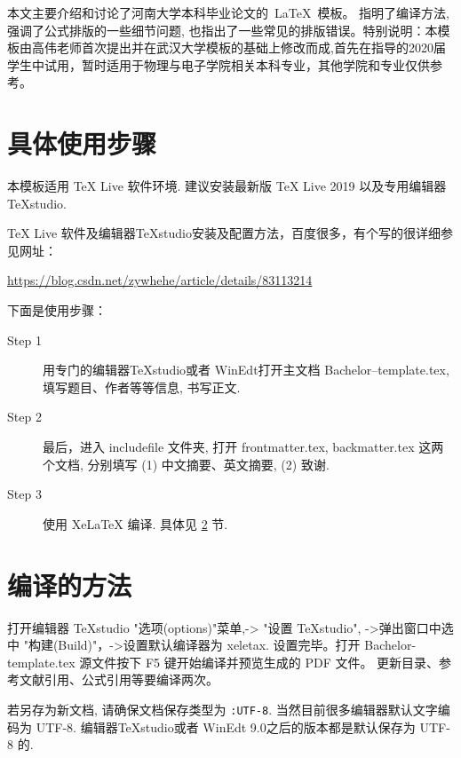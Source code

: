 \documentclass[forprint]{HedaBachelor}
\begin{document}
 本文主要介绍和讨论了河南大学本科毕业论文的~\LaTeX~模板。
 指明了编译方法, 强调了公式排版的一些细节问题, 也指出了一些常见的排版错误。特别说明：本模板由高伟老师首次提出并在武汉大学模板的基础上修改而成,首先在指导的2020届学生中试用，暂时适用于物理与电子学院相关本科专业，其他学院和专业仅供参考。 
 
 \section{具体使用步骤} %
本模板适用 TeX Live 软件环境. 建议安装最新版 TeX Live 2019 以及专用编辑器 TeXstudio. 

TeX Live 软件及编辑器TeXstudio安装及配置方法，百度很多，有个写的很详细参见网址：

\url{https://blog.csdn.net/zywhehe/article/details/83113214}

下面是使用步骤：
 \begin{description}

  \item[Step 1]  用专门的编辑器TeXstudio或者 WinEdt打开主文档 Bachelor--template.tex, 填写题目、作者等等信息, 书写正文.

  \item[Step 2]  最后，进入 includefile 文件夹,  打开 frontmatter.tex, backmatter.tex 这两个文档,  分别填写 (1) 中文摘要、英文摘要, (2) 致谢.

  \item[Step 3]  使用 XeLaTeX 编译. 具体见 \ref{sec-compile} 节.


\end{description}



\section{编译的方法}\label{sec-compile}

打开编辑器 TeXstudio "选项(options)"菜单,-> "设置 TeXstudio", ->弹出窗口中选中 "构建(Build)"，->设置默认编译器为 xeletax. 
设置完毕。打开 Bachelor-template.tex 源文件按下 F5 键开始编译并预览生成的 PDF 文件。
更新目录、参考文献引用、公式引用等要编译两次。

若另存为新文档, 请确保文档保存类型为 \verb|:UTF-8|. 当然目前很多编辑器默认文字编码为 UTF-8.
编辑器TeXstudio或者 WinEdt 9.0之后的版本都是默认保存为 UTF-8 的. 
\end{document}
